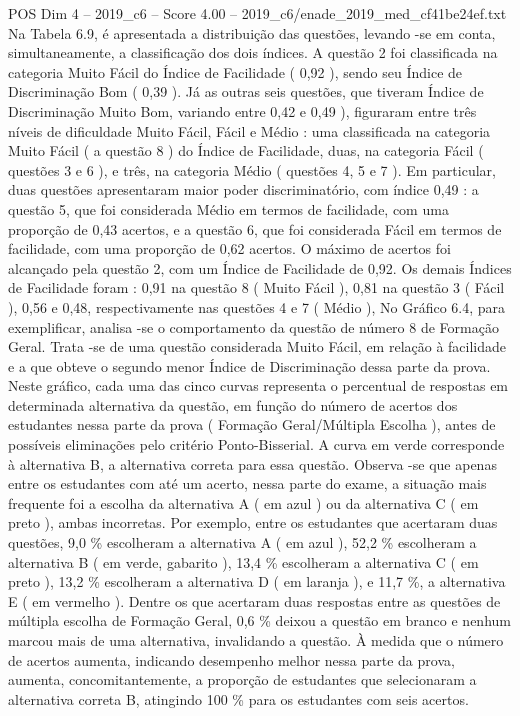 \begin{textsample}{POS Dim 4 – 2019\_c6 – Score 4.00 – 2019\_c6/enade\_2019\_med\_cf41be24ef.txt}
Na Tabela 6.9, é apresentada a distribuição das questões, levando -se em conta, simultaneamente, a classificação dos dois índices.
A questão 2 foi classificada na categoria Muito Fácil do Índice de Facilidade ( 0,92 ), sendo seu Índice de Discriminação Bom ( 0,39 ).
Já as outras seis questões, que tiveram Índice de Discriminação Muito Bom, variando entre 0,42 e 0,49 ), figuraram entre três níveis de dificuldade Muito Fácil, Fácil e Médio : uma classificada na categoria Muito Fácil ( a questão 8 ) do Índice de Facilidade, duas, na categoria Fácil ( questões 3 e 6 ), e três, na categoria Médio ( questões 4, 5 e 7 ).
Em particular, duas questões apresentaram maior poder discriminatório, com índice 0,49 : a questão 5, que foi considerada Médio em termos de facilidade, com uma proporção de 0,43 acertos, e a questão 6, que foi considerada Fácil em termos de facilidade, com uma proporção de 0,62 acertos.
O máximo de acertos foi alcançado pela questão 2, com um Índice de Facilidade de 0,92.
Os demais Índices de Facilidade foram : 0,91 na questão 8 ( Muito Fácil ), 0,81 na questão 3 ( Fácil ), 0,56 e 0,48, respectivamente nas questões 4 e 7 ( Médio ), No Gráfico 6.4, para exemplificar, analisa -se o comportamento da questão de número 8 de Formação Geral.
Trata -se de uma questão considerada Muito Fácil, em relação à facilidade e a que obteve o segundo menor Índice de Discriminação dessa parte da prova.
Neste gráfico, cada uma das cinco curvas representa o percentual de respostas em determinada alternativa da questão, em função do número de acertos dos estudantes nessa parte da prova ( Formação Geral/Múltipla Escolha ), antes de possíveis eliminações pelo critério Ponto-Bisserial.
A curva em verde corresponde à alternativa B, a alternativa correta para essa questão.
Observa -se que apenas entre os estudantes com até um acerto, nessa parte do exame, a situação mais frequente foi a escolha da alternativa A ( em azul ) ou da alternativa C ( em preto ), ambas incorretas.
Por exemplo, entre os estudantes que acertaram duas questões, 9,0 \% escolheram a alternativa A ( em azul ), 52,2 \% escolheram a alternativa B ( em verde, gabarito ), 13,4 \% escolheram a alternativa C ( em preto ), 13,2 \% escolheram a alternativa D ( em laranja ), e 11,7 \%, a alternativa E ( em vermelho ).
Dentre os que acertaram duas respostas entre as questões de múltipla escolha de Formação Geral, 0,6 \% deixou a questão em branco e nenhum marcou mais de uma alternativa, invalidando a questão.
À medida que o número de acertos aumenta, indicando desempenho melhor nessa parte da prova, aumenta, concomitantemente, a proporção de estudantes que selecionaram a alternativa correta B, atingindo 100 \% para os estudantes com seis acertos.

\end{textsample}
